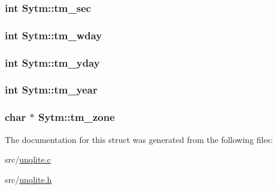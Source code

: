 \hypertarget{struct_sytm_af4c2dd081e6b293221a678ecaae18a04}{
\subsubsection[{tm\-\_\-sec}]{\setlength{\rightskip}{0pt plus 5cm}int Sytm\-::tm\-\_\-sec}}\label{d9/dbb/struct_sytm_af4c2dd081e6b293221a678ecaae18a04}
\hypertarget{struct_sytm_a5ec4dcc908bc93d0aaaa0a35c1019885}{
\subsubsection[{tm\-\_\-wday}]{\setlength{\rightskip}{0pt plus 5cm}int Sytm\-::tm\-\_\-wday}}\label{d9/dbb/struct_sytm_a5ec4dcc908bc93d0aaaa0a35c1019885}
\hypertarget{struct_sytm_a2cf36b4654391c5240bfc80c15c5b2cd}{
\subsubsection[{tm\-\_\-yday}]{\setlength{\rightskip}{0pt plus 5cm}int Sytm\-::tm\-\_\-yday}}\label{d9/dbb/struct_sytm_a2cf36b4654391c5240bfc80c15c5b2cd}
\hypertarget{struct_sytm_ab0bcd674d479bf65360d1c606883deb2}{
\subsubsection[{tm\-\_\-year}]{\setlength{\rightskip}{0pt plus 5cm}int Sytm\-::tm\-\_\-year}}\label{d9/dbb/struct_sytm_ab0bcd674d479bf65360d1c606883deb2}
\hypertarget{struct_sytm_aa13abfb106bb48e07583c1b1ebfc41f2}{
\subsubsection[{tm\-\_\-zone}]{\setlength{\rightskip}{0pt plus 5cm}char $\ast$ Sytm\-::tm\-\_\-zone}}\label{d9/dbb/struct_sytm_aa13abfb106bb48e07583c1b1ebfc41f2}


The documentation for this struct was generated from the following files\-:\begin{DoxyCompactItemize}
\item 
src/\hyperlink{unqlite_8c}{unqlite.\-c}\item 
src/\hyperlink{unqlite_8h}{unqlite.\-h}\end{DoxyCompactItemize}
